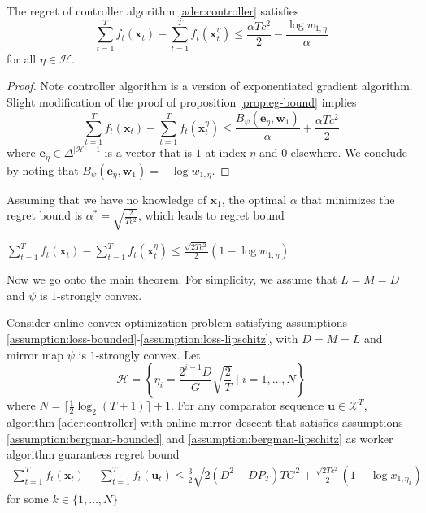 \documentclass[12pt, a4paper]{report}
\begin{document}
\begin{lem} \label{lem:controller}
The regret of controller algorithm \ref{ader:controller} satisfies
\begin{equation*} 
    \sum_{t=1}^T f_t(\mathbf{x}_t) - \sum_{t=1}^T f_t(\mathbf{x}_t^\eta) \leq \frac{\alpha Tc^2}{2} - \frac{\log w_{1, \eta}}{\alpha}
\end{equation*}
for all $\eta \in \mathcal{H}$.
\end{lem}
\begin{proof}
Note controller algorithm is a version of exponentiated gradient algorithm. Slight modification of the proof of proposition \ref{prop:eg-bound} implies
\begin{equation*}
    \sum_{t=1}^T f_t(\mathbf{x}_t) - \sum_{t=1}^T f_t(\mathbf{x}_t^\eta) \leq \frac{B_\psi(\mathbf{e}_\eta, \mathbf{w}_1)}{\alpha} + \frac{\alpha Tc^2}{2}
\end{equation*}
where $\mathbf{e}_\eta \in \Delta^{|\mathcal{H}| - 1}$ is a vector that is $1$ at index $\eta$ and $0$ elsewhere. We conclude by noting that $B_\psi(\mathbf{e}_\eta, \mathbf{w}_1) = -\log w_{1, \eta}$.
\end{proof}
Assuming that we have no knowledge of $\mathbf{x}_1$, the optimal $\alpha$ that minimizes the regret bound is $\alpha^* = \sqrt{\frac{2}{Tc^2}}$, which leads to regret bound
\begin{center}
    $\displaystyle \sum_{t=1}^T f_t(\mathbf{x}_t) - \sum_{t=1}^T f_t(\mathbf{x}_t^\eta) \leq \frac{\sqrt{2Tc^2}}{2}(1 - \log w_{1, \eta})$
\end{center}
Now we go onto the main theorem. For simplicity, we assume that $L = M = D$ and $\psi$ is $1$-strongly convex.
\begin{prop} \label{ader:bound}
Consider online convex optimization problem satisfying assumptions \ref{assumption:loss-bounded}-\ref{assumption:loss-lipschitz}, with $D = M = L$ and mirror map $\psi$ is $1$-strongly convex. Let 
\begin{equation*}
    \mathcal{H} = \left\{ \eta_i = \frac{2^{i-1}D}{G}\sqrt{\frac{2}{T}} \mid i = 1, \dots, N \right\}
\end{equation*}
where $N = \lceil \frac{1}{2} \log_2(T+1) \rceil + 1$. For any comparator sequence $\mathbf{u} \in \mathcal{X}^T$, algorithm \ref{ader:controller} with online mirror descent that satisfies assumptions \ref{assumption:bergman-bounded} and \ref{assumption:bergman-lipschitz} as worker algorithm guarantees regret bound
\begin{align*}
    \sum_{t=1}^T f_t(\mathbf{x}_t) - \sum_{t=1}^T f_t(\mathbf{u}_t) \leq \frac{3}{2}\sqrt{2(D^2 + DP_T)TG^2} + \frac{\sqrt{2Tc^2}}{2}(1 - \log x_{1, \eta_k}) 
\end{align*}
for some $k \in \{1, \dots, N \}$
\end{prop}
\end{document}

